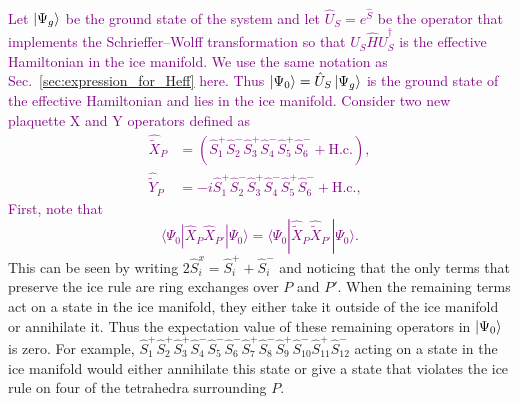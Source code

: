 \documentclass[twocolumn,superscriptaddress,amsmath,amssymb,aps,prx,nofootinbib]{revtex4-2}
\newcommand{\newtext}[1]{\textcolor{purple}{#1}}
\begin{document}
\newtext{Let $\ket{\Psi_g}$ be the ground state of the system and let $\hat{U}_{S} = e^{\hat{S}}$ be the operator that implements the Schrieffer–Wolff transformation so that $\hat{U}_{S} \hat{H} \hat{U}_{S}^\dagger$ is the effective Hamiltonian in the ice manifold.
We use the same notation as Sec.~\ref{sec:expression_for_Heff} here.
Thus $\ket{\Psi_0} = \hat{U}_S \ket{\Psi_g}$ is the ground state of the effective Hamiltonian and lies in the ice manifold. 
Consider two new plaquette X and Y operators defined as
 \begin{equation} \label{eq:xp_yp_tilde_def}
  \begin{aligned}
    \hat{\tilde{X}}_{P} &=  \left( \hat{S}_1^+ \hat{S}_2^-\hat{S}_3^+\hat{S}_4^-\hat{S}_5^+\hat{S}_6^-   + \text{H.c.} \right) ,\\
      \hat{\tilde{Y}}_{P} & = -i \hat{S}_1^+ \hat{S}_2^-\hat{S}_3^+\hat{S}_4^-\hat{S}_5^+\hat{S}_6^-   + \text{H.c.},
\end{aligned}
\end{equation}
First, note that 
\begin{equation} \label{eq:xpxp_to_tildexp_tildexp}
\langle \Psi_0 | \hat{X}_P \hat{X}_{P'} | \Psi_0 \rangle = \langle \Psi_0  | \hat{\tilde{X}}_P \hat{\tilde{X}}_{P'} | \Psi_0 \rangle. 
\end{equation}}
This can be seen by writing $2\hat{S}^x_i  = \hat{S}^+_i + \hat{S}^-_i$ and noticing that the only terms that preserve the ice rule are ring exchanges over $P$ and $P'$.
When the remaining terms act on a state in the ice manifold, they either take it outside of the ice manifold or annihilate it. Thus the  expectation value of these remaining operators in $\ket{\Psi_0}$ is zero. 
For example, $\hat{S}_1^+ \hat{S}_2^+ \hat{S}_3^+ \hat{S}_4^- \hat{S}_5^- \hat{S}_6^- \hat{S}_{7}^+ \hat{S}_{8}^- \hat{S}_{9}^+ \hat{S}_{10}^- \hat{S}_{11}^+ \hat{S}_{12}^{-}$ acting on a state in the ice manifold would either annihilate this state or give a state that violates the ice rule on four of the tetrahedra surrounding $P$.
\end{document}
